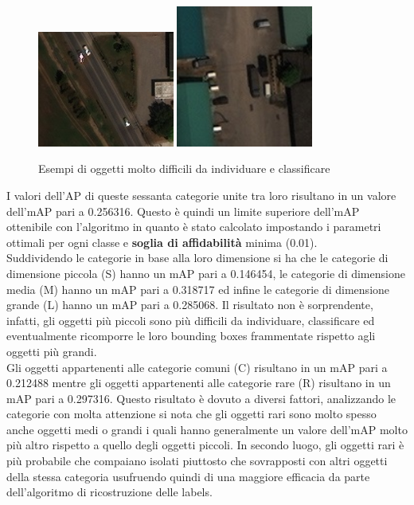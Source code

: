 \begin{figure}
\begin{center}
\includegraphics[width=0.4\textwidth, height=0.25\textheight]{images/auto1-satellite.jpg}
\includegraphics[width=0.4\textwidth, height=0.25\textheight]{images/auto2-satellite.jpg}
\end{center}
\caption{Esempi di oggetti molto difficili da individuare e classificare}
\end{figure}
I valori dell'AP di queste sessanta categorie unite tra loro risultano in un valore dell'mAP pari a 0.256316. Questo è quindi un limite superiore dell'mAP ottenibile con l'algoritmo in quanto è stato calcolato impostando i parametri ottimali per ogni classe e \textbf{soglia di affidabilità} minima (0.01).\\
Suddividendo le categorie in base alla loro dimensione si ha che le categorie di dimensione piccola (S) hanno un mAP pari a 0.146454, le categorie di dimensione media (M) hanno un mAP pari a 0.318717 ed infine le categorie di dimensione grande (L) hanno un mAP pari a 0.285068. Il risultato non è sorprendente, infatti, gli oggetti più piccoli sono più difficili da individuare, classificare ed eventualmente ricomporre le loro bounding boxes frammentate rispetto agli oggetti più grandi.\\
Gli oggetti appartenenti alle categorie comuni (C) risultano in un mAP pari a 0.212488 mentre gli oggetti appartenenti alle categorie rare (R) risultano in un mAP pari a 0.297316. Questo risultato è dovuto a diversi fattori, analizzando le categorie con molta attenzione si nota che gli oggetti rari sono molto spesso anche oggetti medi o grandi i quali hanno generalmente un valore dell'mAP molto più altro rispetto a quello degli oggetti piccoli. In secondo luogo, gli oggetti rari è più probabile che compaiano isolati piuttosto che sovrapposti con altri oggetti della stessa categoria usufruendo quindi di una maggiore efficacia da parte dell'algoritmo di ricostruzione delle labels.

